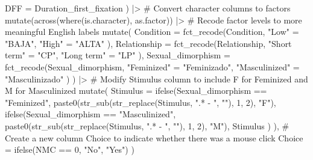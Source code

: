 \documentclass[
  bookmarksnumbered]{article}
\newenvironment{Shaded}{\begin{snugshade}}{\end{snugshade}}
\newcommand{\AttributeTok}[1]{\textcolor[rgb]{0.80,0.80,0.80}{#1}}
\newcommand{\CommentTok}[1]{\textcolor[rgb]{0.50,0.62,0.50}{#1}}
\newcommand{\DecValTok}[1]{\textcolor[rgb]{0.86,0.86,0.80}{#1}}
\newcommand{\FunctionTok}[1]{\textcolor[rgb]{0.94,0.94,0.56}{#1}}
\newcommand{\NormalTok}[1]{\textcolor[rgb]{0.80,0.80,0.80}{#1}}
\newcommand{\OtherTok}[1]{\textcolor[rgb]{0.94,0.94,0.56}{#1}}
\newcommand{\SpecialCharTok}[1]{\textcolor[rgb]{0.86,0.64,0.64}{#1}}
\newcommand{\StringTok}[1]{\textcolor[rgb]{0.80,0.58,0.58}{#1}}
\begin{document}
\begin{Shaded}
\begin{Highlighting}[]
    \AttributeTok{DFF =}\NormalTok{ Duration\_first\_fixation}
\NormalTok{  ) }\SpecialCharTok{|\textgreater{}}
  \CommentTok{\# Convert character columns to factors}
  \FunctionTok{mutate}\NormalTok{(}\FunctionTok{across}\NormalTok{(}\FunctionTok{where}\NormalTok{(is.character), as.factor)) }\SpecialCharTok{|\textgreater{}}
  \CommentTok{\# Recode factor levels to more meaningful English labels}
  \FunctionTok{mutate}\NormalTok{(}
    \AttributeTok{Condition =} \FunctionTok{fct\_recode}\NormalTok{(Condition,}
      \StringTok{"Low"} \OtherTok{=} \StringTok{"BAJA"}\NormalTok{,}
      \StringTok{"High"} \OtherTok{=} \StringTok{"ALTA"}
\NormalTok{    ),}
    \AttributeTok{Relationship =} \FunctionTok{fct\_recode}\NormalTok{(Relationship,}
      \StringTok{"Short term"} \OtherTok{=} \StringTok{"CP"}\NormalTok{,}
      \StringTok{"Long term"} \OtherTok{=} \StringTok{"LP"}
\NormalTok{    ),}
    \AttributeTok{Sexual\_dimorphism =} \FunctionTok{fct\_recode}\NormalTok{(Sexual\_dimorphism,}
      \StringTok{"Feminized"} \OtherTok{=} \StringTok{"Feminizado"}\NormalTok{,}
      \StringTok{"Masculinized"} \OtherTok{=} \StringTok{"Masculinizado"}
\NormalTok{    )}
\NormalTok{  ) }\SpecialCharTok{|\textgreater{}}
  \CommentTok{\# Modify \textquotesingle{}Stimulus\textquotesingle{} column to include \textquotesingle{}F\textquotesingle{} for Feminized and \textquotesingle{}M\textquotesingle{} for Masculinized}
  \FunctionTok{mutate}\NormalTok{(}
    \AttributeTok{Stimulus =} \FunctionTok{ifelse}\NormalTok{(Sexual\_dimorphism }\SpecialCharTok{==} \StringTok{"Feminized"}\NormalTok{,}
      \FunctionTok{paste0}\NormalTok{(}\FunctionTok{str\_sub}\NormalTok{(}\FunctionTok{str\_replace}\NormalTok{(Stimulus, }\StringTok{".* {-} "}\NormalTok{, }\StringTok{""}\NormalTok{), }\DecValTok{1}\NormalTok{, }\DecValTok{2}\NormalTok{), }\StringTok{"F"}\NormalTok{),}
      \FunctionTok{ifelse}\NormalTok{(Sexual\_dimorphism }\SpecialCharTok{==} \StringTok{"Masculinized"}\NormalTok{,}
        \FunctionTok{paste0}\NormalTok{(}\FunctionTok{str\_sub}\NormalTok{(}\FunctionTok{str\_replace}\NormalTok{(Stimulus, }\StringTok{".* {-} "}\NormalTok{, }\StringTok{""}\NormalTok{), }\DecValTok{1}\NormalTok{, }\DecValTok{2}\NormalTok{), }\StringTok{"M"}\NormalTok{),}
\NormalTok{        Stimulus}
\NormalTok{      )}
\NormalTok{    ),}
    \CommentTok{\# Create a new column \textquotesingle{}Choice\textquotesingle{} to indicate whether there was a mouse click}
    \AttributeTok{Choice =} \FunctionTok{ifelse}\NormalTok{(NMC }\SpecialCharTok{==} \DecValTok{0}\NormalTok{, }\StringTok{"No"}\NormalTok{, }\StringTok{"Yes"}\NormalTok{)}
\NormalTok{  )}
\end{Highlighting}
\end{Shaded}
\end{document}
